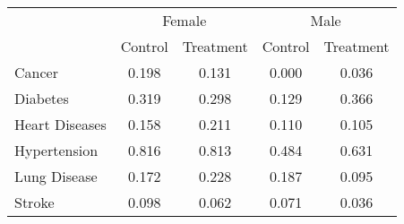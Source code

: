 \begin{tabular}{lcccc} \toprule
 & \multicolumn{2}{c}{Female} & \multicolumn{2}{c}{Male} \\
 & Control  & Treatment  & Control  & Treatment  \\  \midrule 
Cancer &     0.198 &     0.131 &     0.000 &     0.036 \\  
Diabetes &     0.319 &     0.298 &     0.129 &     0.366 \\  
Heart Diseases &     0.158 &     0.211 &     0.110 &     0.105 \\  
Hypertension &     0.816 &     0.813 &     0.484 &     0.631 \\  
Lung Disease &     0.172 &     0.228 &     0.187 &     0.095 \\  
Stroke &     0.098 &     0.062 &     0.071 &     0.036 \\ \toprule \end{tabular}
